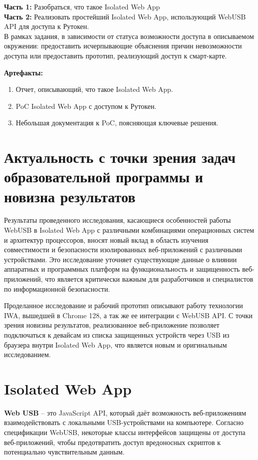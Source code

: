 \documentclass[12pt]{article}
\begin{document}
\textbf{Часть 1:} Разобраться, что такое Isolated Web App \\
\textbf{Часть 2:} Реализовать простейший Isolated Web App, использующий WebUSB API для доступа к Рутокен. \\

В рамках задания, в зависимости от статуса возможности доступа в описываемом окружении: предоставить исчерпывающие объяснения причин невозможности доступа или предоставить прототип, реализующий доступ к смарт-карте.

\begin{tcolorbox}
\textbf{Артефакты: }
\begin{enumerate}
    \item Отчет, описывающий, что такое Isolated Web App.
    \item PoC Isolated Web App с доступом к Рутокен. 
    \item Небольшая документация к PoC, поясняющая ключевые решения.
\end{enumerate}
\end{tcolorbox}

\section{Актуальность с точки зрения задач образовательной программы и новизна результатов}
Результаты проведенного исследования, касающиеся особенностей работы WebUSB в Isolated Web App с различными комбинациями операционных систем и архитектур процессоров, вносят новый вклад в область изучения совместимости и безопасности изолированных веб-приложений с различными устройствами. Это исследование уточняет существующие данные о влиянии аппаратных и программных платформ на функциональность и защищенность веб-приложений, что является критически важным для разработчиков и специалистов по информационной безопасности. 

Проделанное исследование и рабочий прототип описывают работу технологии IWA, вышедшей в Chrome 128, а так же ее интеграции с WebUSB API. С точки зрения новизны результатов, реализованное веб-приложение позволяет подключаться к девайсам из списка защищенных устройств через USB из браузера внутри Isolated Web App, что является новым и оригинальным исследованием. 

\section{Isolated Web App}
\textbf{Web USB} -- это JavaScript API, который даёт возможность веб-приложениям взаимодействовать с локальными USB-устройствами на компьютере. Согласно спецификации WebUSB, некоторые классы интерфейсов защищены от доступа веб-приложений, чтобы предотвратить доступ вредоносных скриптов к потенциально чувствительным данным. 
\end{document}
